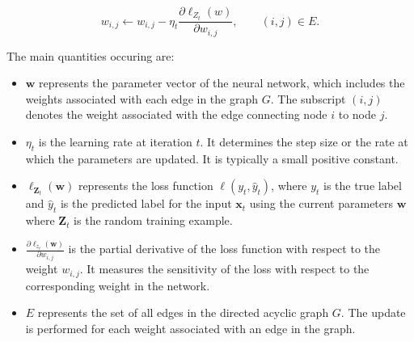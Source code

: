\begin{itemize}
$$w_{i,j} \leftarrow w_{i,j} - \eta_t \frac{\partial \ell_{Z_t} (w)}{\partial w_{i,j}},\qquad (i,j) \in E.$$

The main quantities occuring are:

\begin{itemize}
\item $\boldsymbol{w}$ represents the parameter vector of the neural network, which includes the weights associated with each edge in the graph $G$. The subscript $(i,j)$ denotes the weight associated with the edge connecting node $i$ to node $j$.
\item $\eta_t$ is the learning rate at iteration $t$. It determines the step size or the rate at which the parameters are updated. It is typically a small positive constant.
\item $\ell_{\boldsymbol{Z}_t}(\boldsymbol{w})$ represents the loss function $\ell(y_t, \hat{y}_t)$, where $y_t$ is the true label and $\hat{y}_t$ is the predicted label for the input $\boldsymbol{x}_t$ using the current parameters $\boldsymbol{w}$ where $\boldsymbol{Z}_t$ is the random training example. 
\item $\frac{\partial \ell_{z_t} (\boldsymbol{w})}{\partial w_{i,j}}$ is the partial derivative of the loss function with respect to the weight $w_{i,j}$. It measures the sensitivity of the loss with respect to the corresponding weight in the network.
\item $E$ represents the set of all edges in the directed acyclic graph $G$. The update is performed for each weight associated with an edge in the graph.
\end{itemize}
            
\end{itemize}
